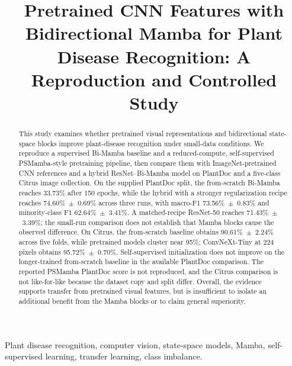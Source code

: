 \documentclass[conference]{IEEEtran}
\begin{document}
\title{Pretrained CNN Features with Bidirectional Mamba for Plant Disease Recognition: A Reproduction and Controlled Study}

\author{
}

\maketitle

\begin{abstract}
This study examines whether pretrained visual representations and bidirectional state-space blocks improve plant-disease recognition under small-data conditions. We reproduce a supervised Bi-Mamba baseline and a reduced-compute, self-supervised PSMamba-style pretraining pipeline, then compare them with ImageNet-pretrained CNN references and a hybrid ResNet--Bi-Mamba model on PlantDoc and a five-class Citrus image collection. On the supplied PlantDoc split, the from-scratch Bi-Mamba reaches 33.73\% after 150 epochs, while the hybrid with a stronger regularization recipe reaches 74.60\%~$\pm$~0.69\% across three runs, with macro-F1 73.56\%~$\pm$~0.83\% and minority-class F1 62.64\%~$\pm$~3.41\%. A matched-recipe ResNet-50 reaches 71.43\%~$\pm$~3.39\%; the small-run comparison does not establish that Mamba blocks cause the observed difference. On Citrus, the from-scratch baseline obtains 90.61\%~$\pm$~2.24\% across five folds, while pretrained models cluster near 95\%; ConvNeXt-Tiny at 224 pixels obtains 95.72\%~$\pm$~0.70\%. Self-supervised initialization does not improve on the longer-trained from-scratch baseline in the available PlantDoc comparison. The reported PSMamba PlantDoc score is not reproduced, and the Citrus comparison is not like-for-like because the dataset copy and split differ. Overall, the evidence supports transfer from pretrained visual features, but is insufficient to isolate an additional benefit from the Mamba blocks or to claim general superiority.
\end{abstract}

\begin{IEEEkeywords}
Plant disease recognition, computer vision, state-space models, Mamba, self-supervised learning, transfer learning, class imbalance.
\end{IEEEkeywords}
\end{document}
